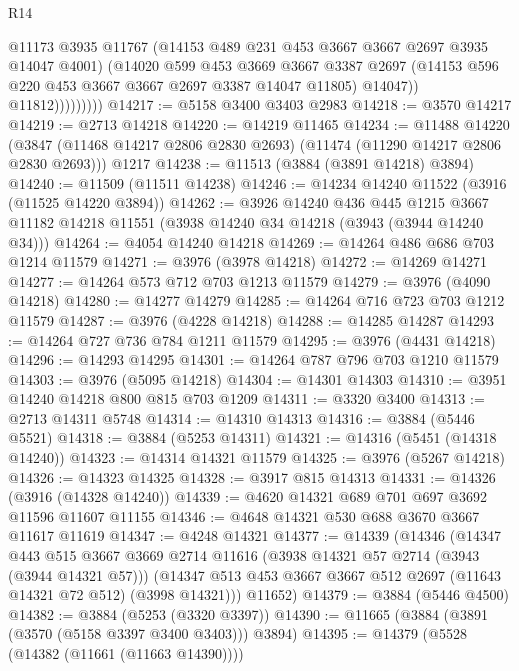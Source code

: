 \begin{lexlean}{R14}
\begin{coremodule}
                        @11173
                        @3935
                        @11767
                        (@14153 @489 @231 @453 @3667 @3667 @2697 @3935 @14047 @4001)
                        (@14020
                          @599
                          @453
                          @3669
                          @3667
                          @3387
                          @2697
                          (@14153 @596 @220 @453 @3667 @3667 @2697 @3387 @14047 @11805)
                          @14047))
                      @11812)))))))))
@14217 := @5158 @3400 @3403 @2983
@14218 := @3570 @14217
@14219 := @2713 @14218
@14220 := @14219 @11465
@14234 := @11488
    @14220
    (@3847 (@11468 @14217 @2806 @2830 @2693) (@11474 (@11290 @14217 @2806 @2830 @2693)))
    @1217
@14238 := @11513 (@3884 (@3891 @14218) @3894)
@14240 := @11509 (@11511 @14238)
@14246 := @14234 @14240 @11522 (@3916 (@11525 @14220 @3894))
@14262 := @3926
    @14240
    @436
    @445
    @1215
    @3667
    @11182
    @14218
    @11551
    (@3938 @14240 @34 @14218 (@3943 (@3944 @14240 @34)))
@14264 := @4054 @14240 @14218
@14269 := @14264 @486 @686 @703 @1214 @11579
@14271 := @3976 (@3978 @14218)
@14272 := @14269 @14271
@14277 := @14264 @573 @712 @703 @1213 @11579
@14279 := @3976 (@4090 @14218)
@14280 := @14277 @14279
@14285 := @14264 @716 @723 @703 @1212 @11579
@14287 := @3976 (@4228 @14218)
@14288 := @14285 @14287
@14293 := @14264 @727 @736 @784 @1211 @11579
@14295 := @3976 (@4431 @14218)
@14296 := @14293 @14295
@14301 := @14264 @787 @796 @703 @1210 @11579
@14303 := @3976 (@5095 @14218)
@14304 := @14301 @14303
@14310 := @3951 @14240 @14218 @800 @815 @703 @1209
@14311 := @3320 @3400
@14313 := @2713 @14311 @5748
@14314 := @14310 @14313
@14316 := @3884 (@5446 @5521)
@14318 := @3884 (@5253 @14311)
@14321 := @14316 (@5451 (@14318 @14240))
@14323 := @14314 @14321 @11579
@14325 := @3976 (@5267 @14218)
@14326 := @14323 @14325
@14328 := @3917 @815 @14313
@14331 := @14326 (@3916 (@14328 @14240))
@14339 := @4620 @14321 @689 @701 @697 @3692 @11596 @11607 @11155
@14346 := @4648 @14321 @530 @688 @3670 @3667 @11617 @11619
@14347 := @4248 @14321
@14377 := @14339
    (@14346
      (@14347
        @443
        @515
        @3667
        @3669
        @2714
        @11616
        (@3938 @14321 @57 @2714 (@3943 (@3944 @14321 @57)))
        (@14347 @513 @453 @3667 @3667 @512 @2697 (@11643 @14321 @72 @512) (@3998 @14321)))
      @11652)
@14379 := @3884 (@5446 @4500)
@14382 := @3884 (@5253 (@3320 @3397))
@14390 := @11665 (@3884 (@3891 (@3570 (@5158 @3397 @3400 @3403))) @3894)
@14395 := @14379 (@5528 (@14382 (@11661 (@11663 @14390))))

\end{coremodule}
\end{lexlean}
